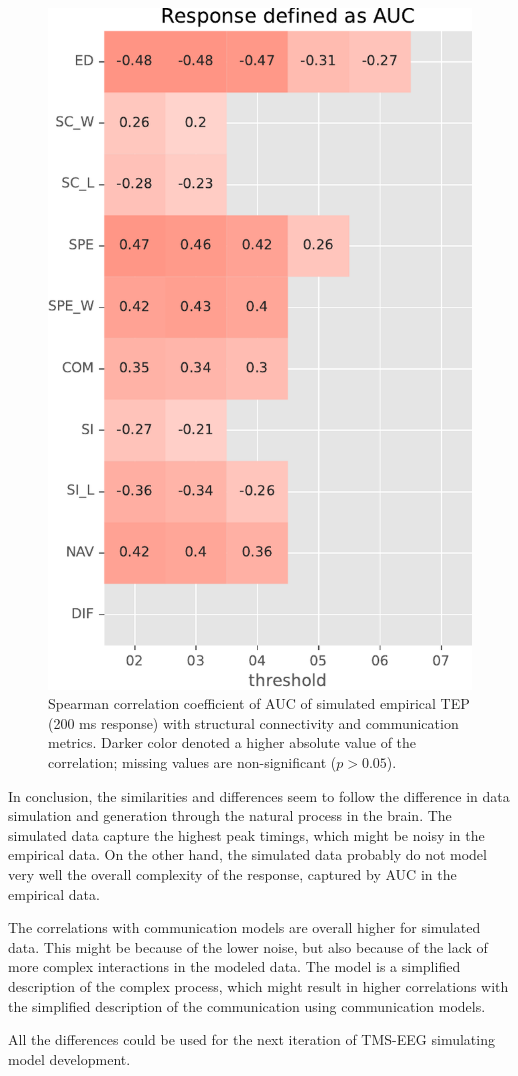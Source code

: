 \begin{figure}
    \centering
    \includegraphics[height=\textwidth]{images/nootebook_generated/tmseeg_results/simulated/200/not_over_threshold_nan/Response defined as AUC.pdf}
    \caption[TEPs AUC (200 ms) correlations (simulated data)]{Spearman correlation coefficient of AUC of simulated empirical TEP (200 ms response) with structural connectivity and communication metrics. Darker color denoted a higher absolute value of the correlation; missing values are non-significant ($p>0.05$).}
    \label{fig:tms_AUC_200_simulated}
\end{figure}

In conclusion, the similarities and differences seem to follow the difference in data simulation and generation through the natural process in the brain. The simulated data capture the highest peak timings, which might be noisy in the empirical data. On the other hand, the simulated data probably do not model very well the overall complexity of the response, captured by AUC in the empirical data. 

The correlations with communication models are overall higher for simulated data. This might be because of the lower noise, but also because of the lack of more complex interactions in the modeled data. The model is a simplified description of the complex process, which might result in higher correlations with the simplified description of the communication using communication models. 

All the differences could be used for the next iteration of TMS-EEG simulating model development.
